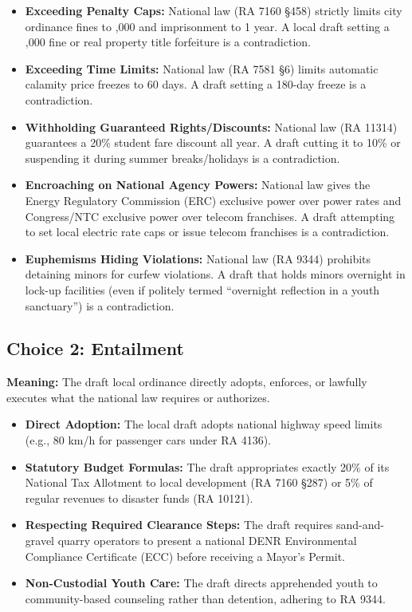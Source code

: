 \begin{itemize}
    \item \textbf{Exceeding Penalty Caps:} National law (RA 7160 \S458) strictly limits city ordinance fines to ,000 and imprisonment to 1 year. A local draft setting a ,000 fine or real property title forfeiture is a contradiction.
    \item \textbf{Exceeding Time Limits:} National law (RA 7581 \S6) limits automatic calamity price freezes to 60 days. A draft setting a 180-day freeze is a contradiction.
    \item \textbf{Withholding Guaranteed Rights/Discounts:} National law (RA 11314) guarantees a 20\% student fare discount all year. A draft cutting it to 10\% or suspending it during summer breaks/holidays is a contradiction.
    \item \textbf{Encroaching on National Agency Powers:} National law gives the Energy Regulatory Commission (ERC) exclusive power over power rates and Congress/NTC exclusive power over telecom franchises. A draft attempting to set local electric rate caps or issue telecom franchises is a contradiction.
    \item \textbf{Euphemisms Hiding Violations:} National law (RA 9344) prohibits detaining minors for curfew violations. A draft that holds minors overnight in lock-up facilities (even if politely termed ``overnight reflection in a youth sanctuary'') is a contradiction.
\end{itemize}

\subsection{Choice 2: Entailment}
\textbf{Meaning:} The draft local ordinance directly adopts, enforces, or lawfully executes what the national law requires or authorizes.

\begin{itemize}
    \item \textbf{Direct Adoption:} The local draft adopts national highway speed limits (e.g., 80 km/h for passenger cars under RA 4136).
    \item \textbf{Statutory Budget Formulas:} The draft appropriates exactly 20\% of its National Tax Allotment to local development (RA 7160 \S287) or 5\% of regular revenues to disaster funds (RA 10121).
    \item \textbf{Respecting Required Clearance Steps:} The draft requires sand-and-gravel quarry operators to present a national DENR Environmental Compliance Certificate (ECC) before receiving a Mayor's Permit.
    \item \textbf{Non-Custodial Youth Care:} The draft directs apprehended youth to community-based counseling rather than detention, adhering to RA 9344.
\end{itemize}

